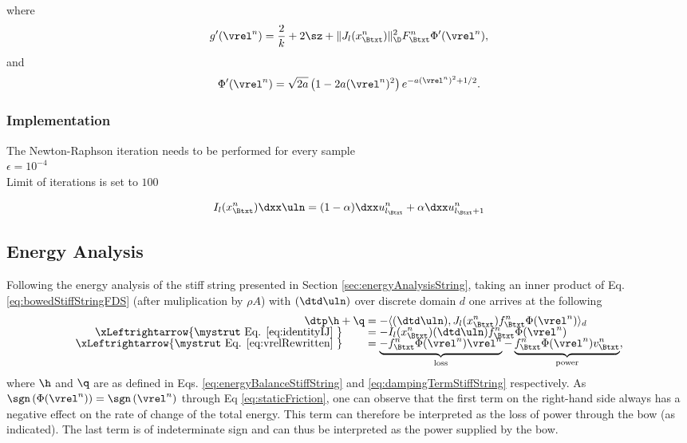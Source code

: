 where
\begin{equation}
    g'(\vrel^n) = \frac{2}{k} + 2\sz + \lVert J_l(x_\Btxt^n)\rVert^2_\D F_\Btxt^n\Phi'(\vrel^n),
\end{equation}
and 
\begin{equation*}
    \begin{aligned}
        \Phi'(\vrel^n) %
        = \sqrt{2a}\left(1 - 2a(\vrel^n)^2\right)e^{-a(\vrel^n)^2+1/2}.
    \end{aligned}
\end{equation*}
\subsubsection{Implementation}
The Newton-Raphson iteration needs to be performed for every sample\\

$\epsilon = 10^{-4}$\\
Limit of iterations is set to $100$

\begin{equation}
    I_l(x_\Btxt^n) \dxx \uln = (1-\alpha)\dxx u_{l_\Btxt}^n + \alpha \dxx u_{l_\Btxt+1}^n
\end{equation}

\subsection{Energy Analysis}
Following the energy analysis of the stiff string presented in Section \eqref{sec:energyAnalysisString}, taking an inner product of Eq. \eqref{eq:bowedStiffStringFDS} (after muliplication by $\rho A$) with $(\dtd \uln)$ over discrete domain $d$ one arrives at the following 
\begin{align*}
    \dtp \h + \q &=  - \langle (\dtd \uln), J_l(x_\Btxt^n)f_\Btxt^n\Phi(\vrel^n) \rangle_d\\[-5pt]
    \xLeftrightarrow{\mystrut\ \text{Eq. \eqref{eq:identityIJ}}\ }\qquad &= -I_l(x_\Btxt^n)(\dtd \uln) f_\Btxt^n \Phi(\vrel^n) \\[-5pt]
    \xLeftrightarrow{\mystrut\ \text{Eq. \eqref{eq:vrelRewritten}}\ } \qquad &= \underbrace{-f_\Btxt^n \Phi(\vrel^n) \vrel^n}_{\text{loss}} - \underbrace{f_\Btxt^n \Phi(\vrel^n)v_\Btxt^n}_{\text{power}},
\end{align*}
where $\h$ and $\q$ are as defined in Eqs. \eqref{eq:energyBalanceStiffString} and \eqref{eq:dampingTermStiffString} respectively. As $\sgn\left(\Phi(\vrel^n)\right) = \sgn\left(\vrel^n\right)$ through Eq \eqref{eq:staticFriction}, one can observe that the first term on the right-hand side always has a negative effect on the rate of change of the total energy. This term can therefore be interpreted as the loss of power through the bow (as indicated). The last term is of indeterminate sign and can thus be interpreted as the power supplied by the bow. 

